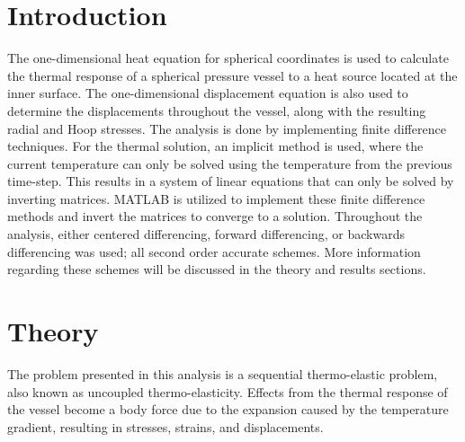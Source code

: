 \documentclass[times]{nmeauth}
\begin{document}
\section{Introduction}
\vspace{-2pt}
The one-dimensional heat equation for spherical coordinates is used to calculate the thermal response of a spherical pressure vessel to a heat source located at the inner surface. The one-dimensional displacement equation is also used to determine the displacements throughout the vessel, along with the resulting radial and Hoop stresses. The analysis is done by implementing finite difference techniques. For the thermal solution, an implicit method is used, where the current temperature can only be solved using the temperature from the previous time-step. This results in a system of linear equations that can only be solved by inverting matrices. MATLAB is utilized to implement these finite difference methods and invert the matrices to converge to a solution. Throughout the analysis, either centered differencing, forward differencing, or backwards differencing was used; all second order accurate schemes. More information regarding these schemes will be discussed in the theory and results sections. 

\vspace{-6pt}

\vspace{-2pt}
\section{Theory}

The problem presented in this analysis is a sequential thermo-elastic problem, also known as uncoupled thermo-elasticity. Effects from the thermal response of the vessel become a body force due to the expansion caused by the temperature gradient, resulting in stresses, strains, and displacements. 
\end{document}
